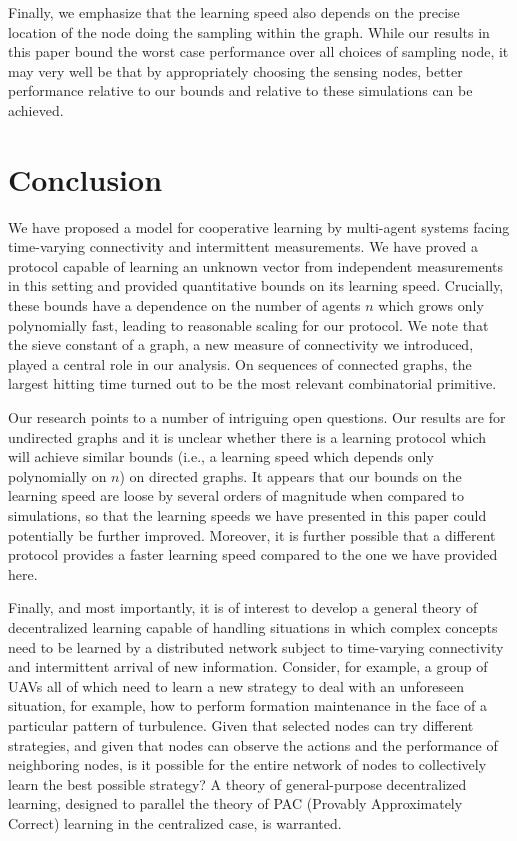 \documentclass[final]{siamltex}
\begin{document}
{{{Finally, we emphasize that the learning speed also depends on the precise location of the node doing the sampling within the graph. While our results in this paper bound the worst case performance over all choices of sampling node, it may very well be that by appropriately choosing the sensing nodes, better performance relative to our bounds and relative to these simulations can be achieved.}}}

\section{Conclusion\label{sec:concl}} We have proposed a model for cooperative learning by multi-agent systems facing time-varying connectivity and intermittent measurements. We have proved a protocol capable of learning an unknown vector from independent measurements in this setting and provided quantitative bounds on its learning speed. Crucially, these bounds have a dependence on the number of agents $n$ which grows only polynomially fast, leading to reasonable scaling for our protocol.  We note that the sieve constant of a graph, a new measure of connectivity we introduced, played a central role in our analysis. On sequences of
connected graphs, the largest hitting time turned out to be the most relevant combinatorial primitive. 

Our research points to a number of intriguing open questions. Our results are for undirected graphs and it is unclear whether there is a learning protocol which will achieve similar bounds (i.e., a learning speed which depends only polynomially on $n$) on directed graphs. It appears that our bounds on the learning speed are loose by several orders of magnitude when compared to simulations, so that the learning speeds we have presented in this paper could potentially be further improved. Moreover, it is further possible that a different protocol provides a faster learning speed compared to the one we have provided here. 

Finally, and most importantly, it is of interest to develop a general theory of decentralized learning capable of handling situations in which complex concepts need to be learned by a distributed network subject to time-varying connectivity and intermittent arrival of new information. Consider, for example, a group of UAVs all of which need to learn a new strategy to deal with an unforeseen situation, for example, how to perform formation maintenance in the face {{{of a particular pattern of turbulence}}}. Given that selected nodes can try different strategies, and given that nodes can observe the actions and the performance of neighboring nodes, is it possible for the entire network of nodes to collectively learn the best possible strategy? A theory of general-purpose decentralized learning, designed to parallel the theory of PAC (Provably Approximately Correct) learning in the centralized case, is warranted.  
\end{document}
